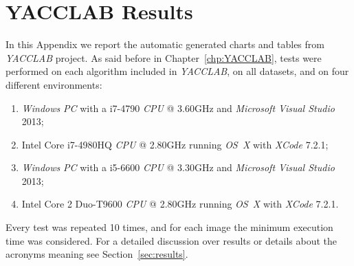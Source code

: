 
\chapter{YACCLAB Results} %

\label{AppendixA} %


In this Appendix we report the automatic generated charts and tables from \textit{YACCLAB} project. As said before in Chapter~\ref{chp:YACCLAB}, tests were performed on each algorithm included in \textit{YACCLAB}, on all datasets, and on four different environments:

\begin{enumerate}
\item \textit{Windows} \textit{PC} with a i7-4790 \textit{CPU} @ 3.60GHz and \textit{Microsoft Visual Studio} 2013; 
\item Intel Core i7-4980HQ \textit{CPU} @ 2.80GHz running \textit{OS~X} with \textit{XCode} 7.2.1;
\item \textit{Windows} \textit{PC} with a i5-6600 \textit{CPU} @ 3.30GHz and \textit{Microsoft Visual Studio} 2013; 
\item Intel Core 2 Duo-T9600 \textit{CPU} @ 2.80GHz running \textit{OS~X} with \textit{XCode} 7.2.1. 
\end{enumerate}

Every test was repeated 10 times, and for each image the minimum execution time was considered. For a detailed discussion over results or details about the acronyms meaning see Section~\ref{sec:results}.

\clearpage

